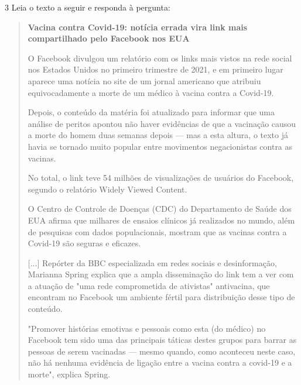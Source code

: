 
\num{3} Leia o texto a seguir e responda à pergunta:

\begin{quote}
\textbf{Vacina contra Covid-19: notícia errada vira link mais
compartilhado pelo Facebook nos EUA}

O Facebook divulgou um relatório com os links mais vistos na rede social
nos Estados Unidos no primeiro trimestre de 2021, e em primeiro lugar
aparece uma notícia no site de um jornal americano que atribuiu
equivocadamente a morte de um médico à vacina contra a Covid-19.

Depois, o conteúdo da matéria foi atualizado para informar que uma
análise de peritos apontou não haver evidências de que a vacinação
causou a morte do homem duas semanas depois --- mas a esta altura, o
texto já havia se tornado muito popular entre movimentos negacionistas
contra as vacinas.

No total, o link teve 54 milhões de visualizações de usuários do
Facebook, segundo o relatório Widely Viewed Content.

O Centro de Controle de Doenças (CDC) do Departamento de Saúde dos EUA
afirma que milhares de ensaios clínicos já realizados no mundo, além de
pesquisas com dados populacionais, mostram que as vacinas contra a
Covid-19 são seguras e eficazes.

{[}...{]} Repórter da BBC especializada em redes sociais e
desinformação, Marianna Spring explica que a ampla disseminação do link
tem a ver com a atuação de "uma rede comprometida de ativistas"
antivacina, que encontram no Facebook um ambiente fértil para
distribuição desse tipo de conteúdo.

"Promover histórias emotivas e pessoais como esta (do médico) no
Facebook tem sido uma das principais táticas destes grupos para barrar
as pessoas de serem vacinadas --- mesmo quando, como aconteceu neste
caso, não há nenhuma evidência de ligação entre a vacina contra a
covid-19 e a morte", explica Spring.

\end{quote}

